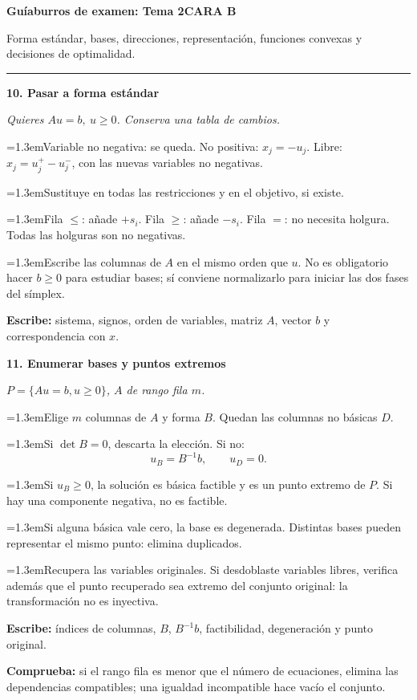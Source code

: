 \documentclass[a4paper,landscape]{article}
\newcommand{\caso}[2]{\par\vspace{5pt}\colorbox{pale}{\parbox{\dimexpr\linewidth-2\fboxsep}{\bfseries\color{accent}#1}}\par\textit{#2}\par}
\newcommand{\paso}[2]{\par\hangindent=1.3em\hangafter=1\makebox[1.3em][l]{\textbf{\color{accent}#1}}#2}
\newcommand{\escribe}[1]{\par\textbf{Escribe:} #1}
\newcommand{\ojo}[1]{\par\textbf{Comprueba:} #1}
\newcommand{\cabecera}[2]{%
  {\fontsize{17}{19}\selectfont\bfseries\color{ink}Guíaburros de examen: Tema 2}\hfill\textbf{\color{accent}#1}\par
  {\color{ink}#2}\par\vspace{2pt}\hrule\vspace{3mm}}
\newcommand{\columna}[1]{\begin{minipage}[t]{0.319\textwidth}\fontsize{9.2}{10.6}\selectfont\RaggedRight #1\end{minipage}}
\begin{document}
\newpage
\cabecera{CARA B}{Forma estándar, bases, direcciones, representación, funciones convexas y decisiones de optimalidad.}
\noindent
\columna{
\caso{10. Pasar a forma estándar}{Quieres \(Au=b,\ u\ge0\). Conserva una tabla de cambios.}
\paso{1.}{Variable no negativa: se queda. No positiva: \(x_j=-u_j\). Libre: \(x_j=u_j^+-u_j^-\), con las nuevas variables no negativas.}
\paso{2.}{Sustituye en todas las restricciones y en el objetivo, si existe.}
\paso{3.}{Fila \(\le\): añade \(+s_i\). Fila \(\ge\): añade \(-s_i\). Fila \(=\): no necesita holgura. Todas las holguras son no negativas.}
\paso{4.}{Escribe las columnas de \(A\) en el mismo orden que \(u\). No es obligatorio hacer \(b\ge0\) para estudiar bases; sí conviene normalizarlo para iniciar las dos fases del símplex.}
\escribe{sistema, signos, orden de variables, matriz \(A\), vector \(b\) y correspondencia con \(x\).}

\caso{11. Enumerar bases y puntos extremos}{\(P=\{Au=b,u\ge0\}\), \(A\) de rango fila \(m\).}
\paso{1.}{Elige \(m\) columnas de \(A\) y forma \(B\). Quedan las columnas no básicas \(D\).}
\paso{2.}{Si \(\det B=0\), descarta la elección. Si no:
\[u_B=B^{-1}b,\qquad u_D=0.\]}
\paso{3.}{Si \(u_B\ge0\), la solución es básica factible y es un punto extremo de \(P\). Si hay una componente negativa, no es factible.}
\paso{4.}{Si alguna básica vale cero, la base es degenerada. Distintas bases pueden representar el mismo punto: elimina duplicados.}
\paso{5.}{Recupera las variables originales. Si desdoblaste variables libres, verifica además que el punto recuperado sea extremo del conjunto original: la transformación no es inyectiva.}
\escribe{índices de columnas, \(B\), \(B^{-1}b\), factibilidad, degeneración y punto original.}
\ojo{si el rango fila es menor que el número de ecuaciones, elimina las dependencias compatibles; una igualdad incompatible hace vacío el conjunto.}
}
\hfill
\end{document}
